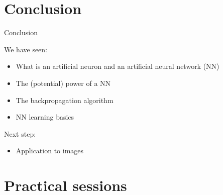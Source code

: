 \documentclass[xcolor=pdftex,dvipsnames,table,mathserif]{beamer}
\begin{document}


\section{Conclusion}


\begin{frame}{Conclusion}

  We have seen:
  \begin{itemize}
  \item What is an artificial neuron and an artificial neural network (NN)
  \item The (potential) power of a NN
  \item The backpropagation algorithm
  \item NN learning basics
  \end{itemize}

  Next step:
  \begin{itemize}
  \item Application to images
  \end{itemize}


\end{frame}



\section*{Practical sessions}
\end{document}
